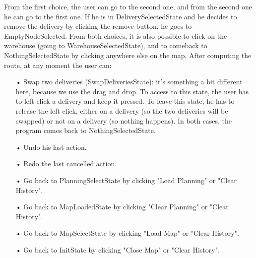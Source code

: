 \documentclass[paper=a4,fontsize=11pt]{report}
\numberwithin{equation}{section}		%
\numberwithin{figure}{section}		%
\numberwithin{table}{section}		%
\begin{document}
From the first choice, the user can go to the second one, and from the second one he can go to the first one. If he is in DeliverySelectedState and he decides to remove the delivery by clicking the remove-button, he goes to EmptyNodeSelected.
From both choices, it is also possible to click on the warehouse (going to WarehouseSelectedState), and to comeback to NothingSelectedState by clicking anywhere else on the map.
After computing the route, at any moment the user can:\\

\begin{itemize}
  \item[•] Swap two deliveries (SwapDeliveriesState): it's something a bit different here, because we use the drag and drop. To access to this state, the user has to left click a delivery and keep it pressed. To leave this state, he has to release the left click, either on a delivery (so the two deliveries will be swapped) or not on a delivery (so nothing happens). In both cases, the program comes back to NothingSelectedState.
  \item[•] Undo his last action.
  \item[•] Redo the last cancelled action.
  \item[•] Go back to PlanningSelectState by clicking "Load Planning" or "Clear History".
  \item[•] Go back to MapLoadedState by clicking "Clear Planning" or "Clear History".
  \item[•] Go back to MapSelectState by clicking "Load Map" or "Clear History".
  \item[•] Go back to InitState by clicking "Close Map" or "Clear History".\\
\end{itemize}
\end{document}
